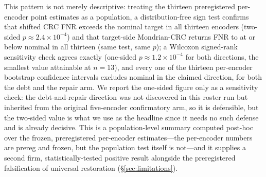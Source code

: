 \documentclass[journal]{IEEEtran}
\renewcommand{\_}{\textunderscore\allowbreak}
\begin{document}
This pattern is not merely descriptive: treating the thirteen preregistered per-encoder point estimates
as a population, a distribution-free sign test confirms that shifted CRC FNR exceeds the nominal target
in all thirteen encoders (two-sided $p\approx2.4\times10^{-4}$) and that target-side Mondrian-CRC returns
FNR to at or below nominal in all thirteen (same test, same $p$); a Wilcoxon signed-rank sensitivity
check agrees exactly (one-sided $p\approx1.2\times10^{-4}$ for both directions, the smallest value
attainable at $n{=}13$), and every one of the thirteen per-encoder bootstrap confidence intervals
excludes nominal in the claimed direction, for both the debt and the repair arm. We report the
one-sided figure only as a sensitivity check: the debt-and-repair direction was not discovered in this
roster run but inherited from the original five-encoder confirmatory arm, so it is defensible, but the
two-sided value is what we use as the headline since it needs no such defense and is already decisive.
This is a population-level summary computed post-hoc over the frozen, preregistered per-encoder
estimates---the per-encoder numbers are prereg and frozen, but the population test itself is not---and
it supplies a second firm, statistically-tested positive result alongside the preregistered
falsification of universal restoration (\S\ref{sec:limitations}).
\end{document}
